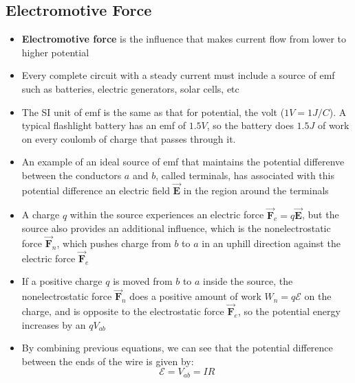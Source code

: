 \documentclass[11pt, a4paper]{article}
\begin{document}
\subsection{Electromotive Force}
\begin{itemize}
    \item \textbf{Electromotive force} is the influence that makes current flow from
        lower to higher potential
    \item Every complete circuit with a steady current must include a source of emf such
        as batteries, electric generators, solar cells, etc
    \item The SI unit of emf is the same as that for potential, the volt ($1V = 1J / C$).
        A typical flashlight battery has an emf of $1.5V$, so the battery does $1.5J$ of
        work on every coulomb of charge that passes through it.
    \item An example of an ideal source of emf that maintains the potential differenve
        between the conductors $a$ and $b$, called terminals, has associated with this
        potential difference an electric field $\vec{\mathbf{E}}$ in the region around
        the terminals
    \item A charge $q$ within the source experiences an electric force
        $\vec{\mathbf{F}}_e = q \vec{\mathbf{E}}$, but the source also provides an
        additional influence, which is the nonelectrostatic force $\vec{\mathbf{F}}_n$,
        which pushes charge from $b$ to $a$ in an uphill direction against the electric
        force $\vec{\mathbf{F}}_e$
    \item If a positive charge $q$ is moved from $b$ to $a$ inside the source, the
        nonelectrostatic force $\vec{\mathbf{F}}_n$ does a positive amount of work
        $W_n = q \mathcal{E}$ on the charge, and is opposite to the electrostatic force
        $\vec{\mathbf{F}}_e$, so the potential energy increases by an $qV_{ab}$
    \item By combining previous equations, we can see that the potential difference
        between the ends of the wire is given by:
        \begin{equation}
            \mathcal{E} = V_{ab} = IR
        \end{equation}
\end{itemize}
\end{document}
